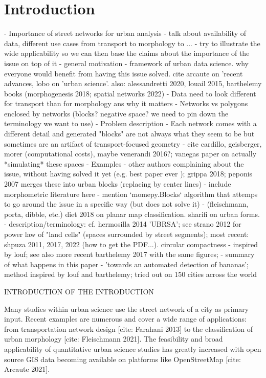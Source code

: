 \section{Introduction}
\label{sec:intro}

- Importance of street networks for urban analysis
    - talk about availability of data, different use cases from transport to morphology
    to ...
    - try to illustrate the wide applicability so we can then base the claims about the
    importance of the issue on top of it
    - general motivation - framework of urban data science. why everyone would
    benefit from having this issue solved. cite arcaute on 'recent advances, lobo on 'urban
    science'. also: alessandretti 2020, louail 2015, barthelemy books (morphogenesis 2018;
    spatial networks 2022)
- Data need to look different for transport than for morphology ans why it matters
    - Networks vs polygons enclosed by networks (blocks? negative space? we need to pin down the
    terminology we want to use)
- Problem description
    - Each network comes with a different detail and generated "blocks" are not always
    what they seem to be but sometimes are an artifact of transport-focused geometry
    - cite cardillo, geisberger, morer (computational costs), maybe venerandi 2016?;
    vanegas paper on actually *simulating* these spaces
- Examples - other authors complaining about the issue, without having solved
it yet (e.g. best paper ever \cite{vybornova2022automated}); grippa 2018; peponis 2007
merges these into urban blocks (replacing by center lines)
    - include morphometric literature here - mention `momepy.Blocks` algorithm that
    attemps to go around the issue in a specific way (but does not solve it)
        - (fleischmann, porta, dibble, etc.) diet 2018 on planar map
        classification. sharifi on urban forms.
    - description/terminology: cf. hermosilla 2014 'UBRSA'; see strano 2012 for power
    law of "land cells" (spaces surrounded by street segments); most recent: shpuza 2011,
    2017, 2022 (how to get the PDF...). circular compactness - inspired by louf; see also
    more recent barthelemy 2017 with the same figures;
-  summary of what happens in this paper
    - 'towards an automated detection of
    bananas'; method inspired by louf and barthelemy; tried out on 150 cities across the
    world


\bigskip

INTRODUCTION OF THE INTRODUCTION
    
Many studies within urban science use the street network of a city as primary input. Recent examples are numerous and cover a wide range of applications: from transportation network design [cite: Farahani 2013] to the classification of urban morphology [cite: Fleischmann 2021]. The feasibility and broad applicability of quantitative urban science studies has greatly increased with open source GIS data becoming available on platforms like OpenStreetMap [cite: Arcaute 2021]. 
    
